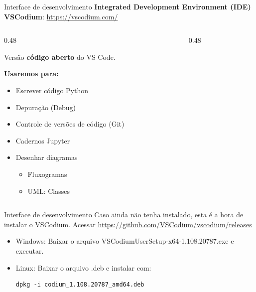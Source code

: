 \documentclass{beamer}
\begin{document}
\begin{frame}{Interface de desenvolvimento}
    \textbf{Integrated Development Environment (IDE)}\\
    \textbf{VSCodium}: \url{https://vscodium.com/}
    \begin{columns}[t]
        \begin{column}[t]{0.48\textwidth}

            Versão \textbf{código aberto} do VS Code.
            
            \textbf{Usaremos para:}
            \begin{itemize}
                \item Escrever código Python
                \item Depuração (Debug)
                \item Controle de versões de código (Git)
                \item Cadernos Jupyter
                \item Desenhar diagramas
                \begin{itemize}
                    \item Fluxogramas
                    \item UML: Classes
                \end{itemize}
            \end{itemize}
        \end{column}
        
        \begin{column}[t]{0.48\textwidth}
        \end{column}
    \end{columns}   
\end{frame}

\begin{frame}[fragile]{Interface de desenvolvimento}
    Caso ainda não tenha instalado, esta é a hora de instalar o VSCodium.
    Acessar \url{https://github.com/VSCodium/vscodium/releases}
    \begin{itemize}
        \item Windows: Baixar o arquivo VSCodiumUserSetup-x64-1.108.20787.exe e executar.
        \item Linux: Baixar o arquivo .deb e instalar com: 
        \\ \begin{verbatim}
dpkg -i codium_1.108.20787_amd64.deb
        \end{verbatim}
            
            
    \end{itemize}
\end{frame}
\end{document}
